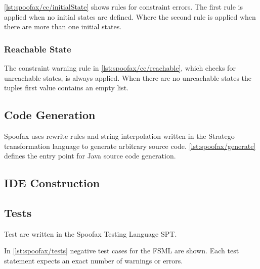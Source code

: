 \autoref{lst:spoofax/cc/initialState} shows rules for constraint errors.
The first rule is applied when no initial states are defined.
Where the second rule is applied when there are more than one initial states.



\subsubsection{Reachable State}

The constraint warning rule in \autoref{lst:spoofax/cc/reachable}, which checks for unreachable states, is always applied.
When there are no unreachable states the tuples first value contains an empty list.



\subsection{Code Generation}

Spoofax uses rewrite rules and string interpolation written in the Stratego transformation language to generate arbitrary source code.
\autoref{lst:spoofax/generate} defines the entry point for Java source code generation.



\subsection{IDE Construction}

\subsection{Tests}

Test are written in the Spoofax Testing Language SPT. 

In \autoref{lst:spoofax/tests} negative test cases for the FSML are shown.
Each test statement expects an exact number of warnings or errors.



